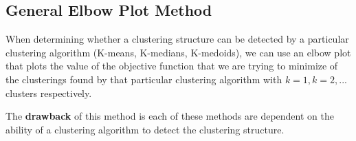 \documentclass[11pt]{elegantbook}
\begin{document}
\subsection{General Elbow Plot Method}
\begin{definition}
    When determining whether a clustering structure can be detected by a particular clustering algorithm (K-means, K-medians, K-medoids), we can use an elbow plot that plots the value of the objective function that we are trying to minimize of the clusterings found by that particular clustering algorithm with $k=1,k=2,...$ clusters respectively.
\end{definition}

The \textbf{drawback} of this method is each of these methods are dependent on the ability of a clustering algorithm to detect the clustering structure.
\end{document}
